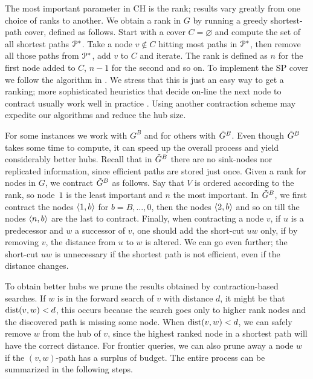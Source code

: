 The most important parameter in CH is the rank; results vary greatly from one choice of ranks to another.
We obtain a rank in $G$ by running a greedy shortest-path cover, defined as follows.
Start with a cover $C=\varnothing$ and compute the set of all shortest paths $\mathcal{P}^*$.
Take a node $v\notin C$ hitting most paths in $\mathcal{P}^*$, then remove all those paths from $\mathcal{P}^*$, add $v$ to $C$ and iterate.
The rank is defined as $n$ for the first node added to $C$, $n-1$ for the second and so on.
To implement the SP cover we follow the algorithm in \cite{hubimplem}.
We stress that this is just an easy way to get a ranking; more sophisticated heuristics that decide on-line the next node to contract usually work well in practice \cite{goldberg_survey,rice_csp}.
Using another contraction scheme may expedite our algorithms and reduce the hub size.

For some instances we work with $G^B$ and for others with $\tilde G^B$.
Even though $\tilde G^B$ takes some time to compute, it can speed up the overall process and yield considerably better hubs. 
Recall that in $\tilde G^B$ there are no sink-nodes nor replicated information, since efficient paths are stored just once.
Given a rank for nodes in $G$, we contract $\tilde G^B$ as follows.
Say that $V$ is ordered according to the rank, so node~$1$ is the least important and $n$ the most important.
In $\tilde G^B$, we first contract the nodes $\langle1,b\rangle$ for $b=B,\ldots,0$, then the nodes $\langle2,b\rangle$ and so on till the nodes $\langle n,b\rangle$ are the last to contract. 
Finally, when contracting a node $v$, if $u$ is a predecessor and $w$ a successor of $v$, one should add the short-cut $uw$ only, if by removing $v$, the distance from $u$ to $w$ is altered.
We can go even further; the short-cut $uw$ is unnecessary if the shortest path is not efficient, even if the distance changes.

To obtain better hubs we prune the results obtained by contraction-based searches.
If $w$ is in the forward search of $v$ with distance $d$, it might be that $\mbox{dist}(v,w)<d$, this occurs because the search goes only to higher rank nodes and the discovered path is missing some node.
When $\mbox{dist}(v,w)<d$, we can safely remove $w$ from the hub of $v$, since the highest ranked node in a shortest path will have the correct distance.
For frontier queries, we can also prune away a node $w$ if the $(v,w)$-path has a surplus of budget.
The entire process can be summarized in the following steps.

